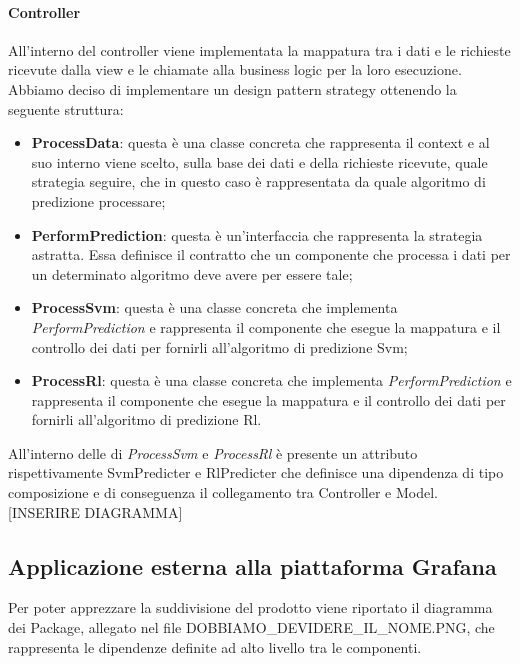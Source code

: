 			\paragraph{Controller}
			All'interno del controller viene implementata la mappatura tra i dati e le richieste ricevute dalla view e le chiamate alla business logic per la loro esecuzione. Abbiamo deciso di implementare un design pattern strategy ottenendo la seguente struttura:
			\begin{itemize}
				\item \textbf{ProcessData}: questa è una classe concreta che rappresenta il context e al suo interno viene scelto, sulla base dei dati e della richieste ricevute, quale strategia seguire, che in questo caso è rappresentata da quale algoritmo di predizione processare;
				\item \textbf{PerformPrediction}: questa è un'interfaccia che rappresenta la strategia astratta. Essa definisce il contratto che un componente che processa i dati per un determinato algoritmo deve avere per essere tale;
				\item \textbf{ProcessSvm}: questa è una classe concreta che implementa \textit{PerformPrediction} e rappresenta il componente che esegue la mappatura e il controllo dei dati per fornirli all'algoritmo di predizione Svm;
				\item \textbf{ProcessRl}: questa è una classe concreta che implementa \textit{PerformPrediction} e rappresenta il componente che esegue la mappatura e il controllo dei dati per fornirli all'algoritmo di predizione Rl.
			\end{itemize}
			All'interno delle di \textit{ProcessSvm} e \textit{ProcessRl} è presente un attributo rispettivamente SvmPredicter e RlPredicter che definisce una dipendenza di tipo composizione e di conseguenza il collegamento tra Controller e Model. [INSERIRE DIAGRAMMA]
	\subsection{Applicazione esterna alla piattaforma Grafana}
	Per poter apprezzare la suddivisione del prodotto viene riportato il diagramma dei Package, allegato nel file DOBBIAMO_DEVIDERE_IL_NOME.PNG, che rappresenta le dipendenze definite ad alto livello tra le componenti.
